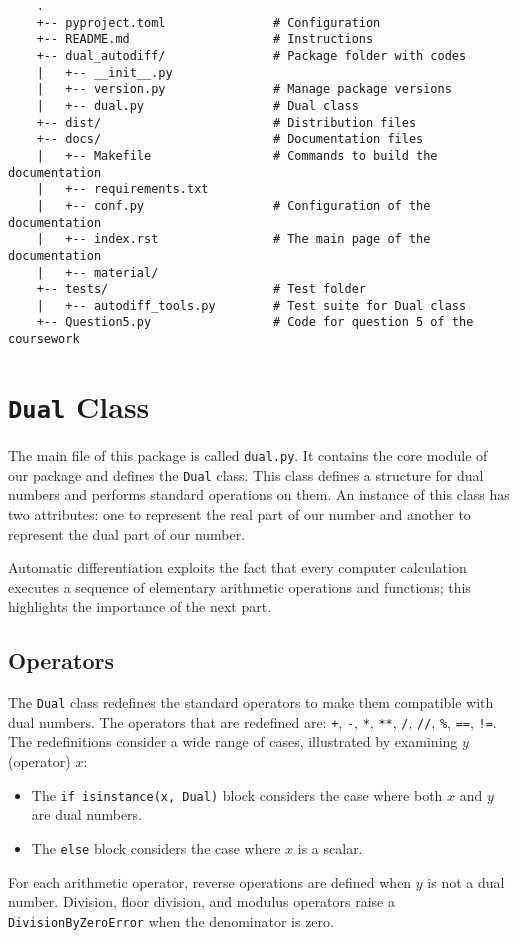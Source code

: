 \documentclass[a4paper,12pt]{article}
\begin{document}
\begin{verbatim}
    .
    +-- pyproject.toml               # Configuration 
    +-- README.md                    # Instructions
    +-- dual_autodiff/               # Package folder with codes
    |   +-- __init__.py
    |   +-- version.py               # Manage package versions
    |   +-- dual.py                  # Dual class
    +-- dist/                        # Distribution files
    +-- docs/                        # Documentation files
    |   +-- Makefile                 # Commands to build the documentation
    |   +-- requirements.txt              
    |   +-- conf.py                  # Configuration of the documentation
    |   +-- index.rst                # The main page of the documentation
    |   +-- material/                
    +-- tests/                       # Test folder
    |   +-- autodiff_tools.py        # Test suite for Dual class
    +-- Question5.py                 # Code for question 5 of the coursework
\end{verbatim}


\section{\texttt{Dual} Class}
The main file of this package is called \texttt{dual.py}. It contains the core module of our package and defines the \texttt{Dual} class. This class defines a structure for dual numbers and performs standard operations on them. An instance of this class has two attributes: one to represent the real part of our number and another to represent the dual part of our number.

Automatic differentiation exploits the fact that every computer calculation executes a sequence of elementary arithmetic operations and functions; this highlights the importance of the next part.

\subsection{Operators}
The \texttt{Dual} class redefines the standard operators to make them compatible with dual numbers. The operators that are redefined are: \texttt{+}, \texttt{-}, \texttt{*}, \texttt{**}, \texttt{/}, \texttt{//}, \texttt{\%}, \texttt{==}, \texttt{!=}. The redefinitions consider a wide range of cases, illustrated by examining $y$ (operator) $x$:
\begin{itemize}
    \item The \texttt{if isinstance(x, Dual)} block considers the case where both $x$ and $y$ are dual numbers.
    \item The \texttt{else} block considers the case where $x$ is a scalar.
\end{itemize}
For each arithmetic operator, reverse operations are defined when $y$ is not a dual number. Division, floor division, and modulus operators raise a \texttt{DivisionByZeroError} when the denominator is zero.
\end{document}
